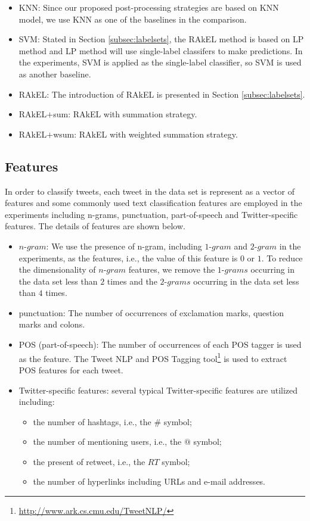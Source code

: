 \documentclass[letterpaper]{article}
\begin{document}
\begin{itemize}
    \item KNN: Since our proposed post-processing strategies are based on KNN model, we use KNN as one of the baselines in the comparison.
    \item SVM: Stated in Section \ref{subsec:labelsets}, the RAkEL method is based on LP method and LP method will use single-label classifers to make predictions. In the experiments, SVM is applied as the single-label classifier, so SVM is used as another baseline.
    \item RAkEL: The introduction of RAkEL is presented in Section \ref{subsec:labelsets}.
    \item RAkEL$+$sum: RAkEL with summation strategy.
    \item RAkEL$+$wsum: RAkEL with weighted summation strategy.
\end{itemize}

\subsection{Features}
\label{subsec:features}
In order to classify tweets, each tweet in the data set is represent as a vector of features and some commonly used text classification features are employed in the experiments including n-grams, punctuation, part-of-speech and Twitter-specific features. The details of features are shown below.

\begin{itemize}
    \item $n$-$gram$: We use the presence of n-gram, including $1$-$gram$ and $2$-$gram$ in the experiments, as the features, i.e., the value of this feature is $0$ or $1$. To reduce the dimensionality of $n$-$gram$ features, we remove the $1$-$grams$ occurring in the data set less than $2$ times and the $2$-$grams$ occurring in the data set less than $4$ times.
    \item punctuation: The number of occurrences of exclamation marks, question marks and colons.
    \item POS (part-of-speech): The number of occurrences of each POS tagger is used as the feature. The Tweet NLP and POS Tagging tool\footnote{\url{http://www.ark.cs.cmu.edu/TweetNLP/}} \cite{owoputi2013improved} is used to extract POS features for each tweet.
    \item Twitter-specific features: several typical Twitter-specific features are utilized including:
        \begin{itemize}
            \item the number of hashtags, i.e., the $\#$ symbol;
            \item the number of mentioning users, i.e., the $@$ symbol;
            \item the present of retweet, i.e., the $RT$ symbol;
            \item the number of hyperlinks including URLs and e-mail addresses.
        \end{itemize}
\end{itemize}
\end{document}
